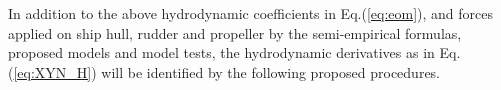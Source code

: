 \noindent In addition to the above hydrodynamic coefficients in Eq.(\ref{eq:eom}), and forces applied on ship hull, rudder and propeller by the semi-empirical formulas, proposed models and model tests, the hydrodynamic derivatives as in Eq.(\ref{eq:XYN_H}) will be identified by the following proposed procedures.